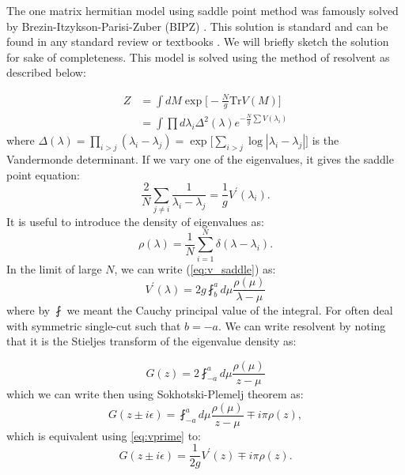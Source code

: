\documentclass[11pt]{article}
\begin{document}
The one matrix hermitian model using saddle point method was famously solved by Brezin-Itzykson-Parisi-Zuber (BIPZ) \cite{Brezin:1977sv}. This solution is standard and can be found in any standard review or textbooks \cite{DiFrancesco:1993cyw, Marino:2004eq}. We will briefly sketch the solution for sake of completeness. This model is solved using the method of resolvent as described below:

\begin{align}
	Z &= \int dM \exp\Big[-\frac{N}{g} \mbox{Tr} V(M)\Big] \\
	& = \int \prod d\lambda_{i} \Delta^2(\lambda)  e^{-\frac{N}{g} \sum V(\lambda_i)} 
\end{align}
where $\Delta(\lambda) = \prod_{i > j} (\lambda_i - \lambda_j) = \exp\Big[\sum_{i>j} \log |\lambda_{i} - \lambda_{j}|\Big]$ is the Vandermonde 
determinant. If we vary one of the eigenvalues, it gives the saddle point equation:
\begin{equation}
	\label{eq:v_saddle}
	\frac{2}{N} \sum_{j \neq i} \frac{1}{\lambda_i - \lambda_j} = \frac{1}{g} V^{\prime}(\lambda_i).
\end{equation}
It is useful to introduce the density of eigenvalues as:
\begin{equation}
	\rho(\lambda) = \frac{1}{N} \sum_{i=1}^{N} \delta(\lambda - \lambda_i). 
\end{equation}
In the limit of large $N$, we can write (\ref{eq:v_saddle})
as:
\begin{equation}
	\label{eq:vprime}
	V^{\prime}(\lambda) = 2g \fint_{b}^{a} d\mu \frac{\rho(\mu)}{\lambda - \mu} 
\end{equation}
where by $\fint$ we meant the Cauchy principal value of the integral. For often deal with symmetric single-cut such that $b=-a$. We can write resolvent by noting that it is the Stieljes transform of the eigenvalue density as: 

\begin{equation}
	G(z) = 2 \fint_{-a}^{a} d\mu \frac{\rho(\mu)}{z - \mu}
\end{equation}
which we can write then using Sokhotski-Plemelj theorem as:
\begin{equation}
	G(z \pm i \epsilon) = \fint_{-a}^{a} d\mu \frac{\rho(\mu)}{z - \mu} \mp i\pi \rho(z),  
\end{equation}
which is equivalent using \ref{eq:vprime} to: 
\begin{equation}
	G(z \pm i \epsilon) = \frac{1}{2g} V^{\prime}(z) \mp i\pi \rho(z).  
\end{equation}
\end{document}
